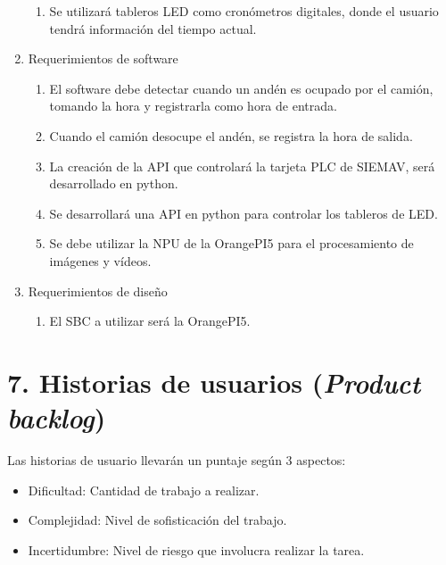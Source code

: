\documentclass[
11pt, %
]{charter}
\begin{document}
\begin{enumerate}
\begin{enumerate}
			\item Se utilizará tableros LED como cronómetros digitales, donde el usuario tendrá información del tiempo actual.
		\end{enumerate}
	\item Requerimientos de software
		\begin{enumerate}
			\item El software debe detectar cuando un andén es ocupado por el camión, tomando la hora y registrarla como hora de entrada.
			\item Cuando el camión desocupe el andén, se registra la hora de salida.
			\item La creación de la API que controlará la tarjeta PLC de SIEMAV, será desarrollado en python.
			\item Se desarrollará una API en python para controlar los tableros de LED.
			\item Se debe utilizar la NPU de la OrangePI5 para el procesamiento de imágenes y vídeos.
		\end{enumerate}
	\item Requerimientos de diseño
		\begin{enumerate}
			\item El SBC a utilizar será la OrangePI5.
		\end{enumerate}
\end{enumerate}

\section{7. Historias de usuarios (\textit{Product backlog})}
\label{sec:backlog}
Las historias de usuario llevarán un puntaje según 3 aspectos:
\begin{itemize}
	\item Dificultad: Cantidad de trabajo a realizar.
	\item Complejidad: Nivel de sofisticación del trabajo.
	\item Incertidumbre: Nivel de riesgo que involucra realizar la tarea.
\end{itemize}
\end{document}
